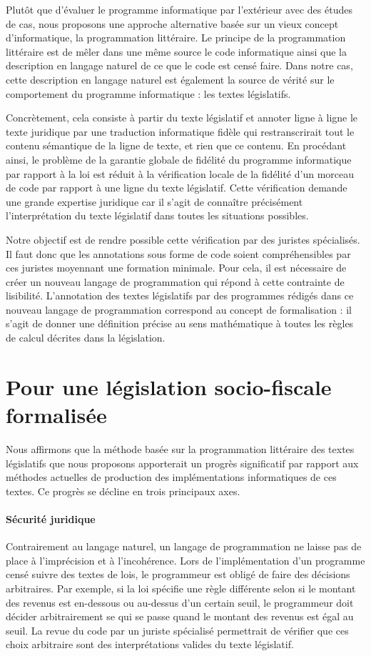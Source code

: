 \documentclass[11pt, french]{article}
\begin{document}
Plutôt que d'évaluer le programme informatique par l'extérieur avec des études de cas, nous proposons
une approche alternative basée sur un vieux concept d'informatique, la programmation littéraire.
Le principe de la programmation littéraire est de mêler dans une même source le code informatique
ainsi que la description en langage naturel de ce que le code est censé faire. Dans notre cas, cette
description en langage naturel est également la source de vérité sur le comportement du programme
informatique : les textes législatifs.

Concrètement, cela consiste à partir du texte législatif et annoter ligne à ligne le texte juridique
par une traduction informatique fidèle qui restranscrirait tout le contenu sémantique de la ligne
de texte, et rien que ce contenu. En procédant ainsi, le problème de la garantie globale de fidélité
du programme informatique par rapport à la loi est réduit à la vérification locale de la fidélité d'un
morceau de code par rapport à une ligne du texte législatif. Cette vérification demande une grande
expertise juridique car il s'agit de connaître précisément l'interprétation du texte législatif dans
toutes les situations possibles.

Notre objectif est de rendre possible cette vérification par des juristes spécialisés. Il faut
donc que les annotations sous forme de code soient compréhensibles par ces juristes moyennant une
formation minimale. Pour cela, il est nécessaire de créer un nouveau langage de programmation qui
répond à cette contrainte de lisibilité. L'annotation des textes législatifs par des programmes
rédigés dans ce nouveau langage de programmation correspond au concept de formalisation : il s'agit
de donner une définition précise au sens mathématique à toutes les règles de calcul décrites
dans la législation.

\section{Pour une législation socio-fiscale formalisée}

Nous affirmons que la méthode basée sur la programmation littéraire des textes législatifs que
nous proposons apporterait un progrès significatif par rapport aux méthodes actuelles de production
des implémentations informatiques de ces textes. Ce progrès se décline en trois principaux axes.

\paragraph{Sécurité juridique} Contrairement au langage naturel, un langage de programmation ne
laisse pas de place à l'imprécision et à l'incohérence. Lors de l'implémentation d'un programme censé
suivre des textes de lois, le programmeur est obligé de faire des décisions arbitraires. Par exemple,
si la loi spécifie une règle différente selon si le montant des revenus est en-dessous ou au-dessus
d'un certain seuil, le programmeur doit décider arbitrairement se qui se passe quand le montant
des revenus est égal au seuil. La revue du code par un juriste spécialisé permettrait de vérifier
que ces choix arbitraire sont des interprétations valides du texte législatif.
\end{document}
